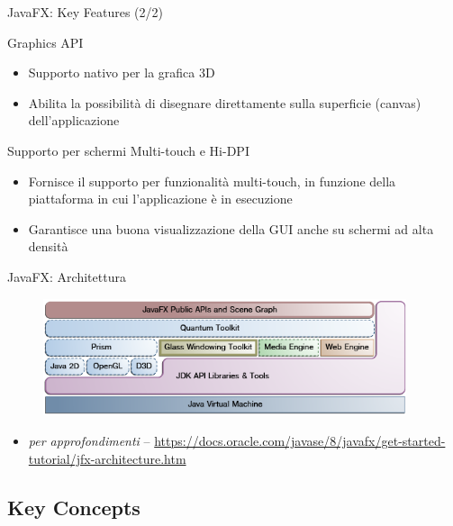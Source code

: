 \documentclass[presentation]{beamer}
\begin{document}
\begin{frame}{JavaFX: Key Features (2/2)}
\begin{block}{Graphics API}
\begin{itemize}
\item Supporto nativo per la grafica 3D
\item Abilita la possibilità di disegnare direttamente sulla superficie (canvas) dell'applicazione
\end{itemize}
\end{block}
%
\begin{block}{Supporto per schermi Multi-touch e Hi-DPI}
\begin{itemize}
\item Fornisce il supporto per funzionalità  multi-touch, in funzione della piattaforma in cui l'applicazione è in esecuzione
\item Garantisce una buona visualizzazione della GUI anche su schermi ad alta densità
\end{itemize}
\end{block}
\end{frame}

\begin{frame}{JavaFX: Architettura}
\begin{figure}
\includegraphics[width=0.95\textwidth]{img/javafx-architecture.png}
\end{figure}
\begin{itemize}
\item \emph{per approfondimenti} -- \url{https://docs.oracle.com/javase/8/javafx/get-started-tutorial/jfx-architecture.htm}
\end{itemize}
\end{frame}

\subsection{Key Concepts}
\end{document}
